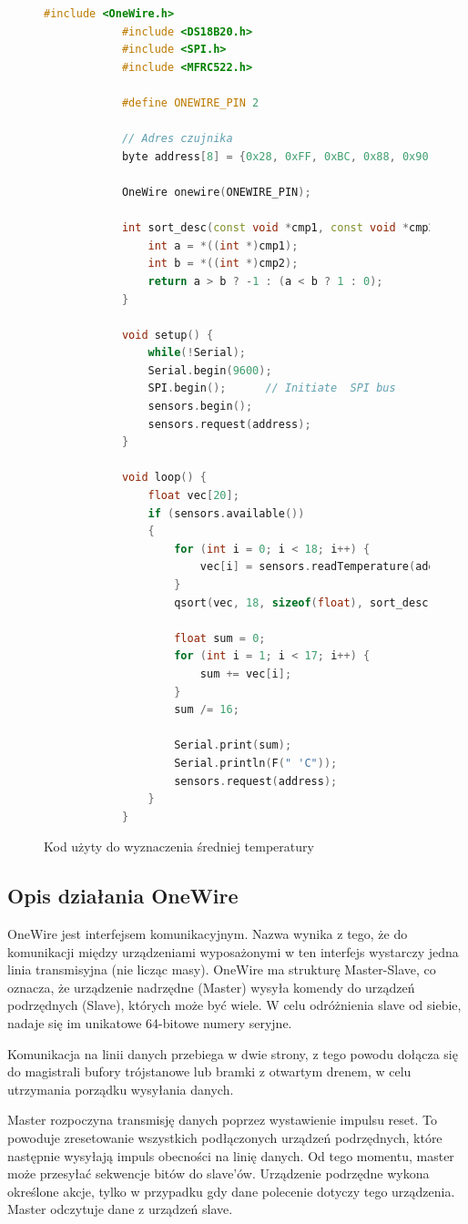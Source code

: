 \documentclass[polish,a4paper]{article}
\begin{document}
	\begin{figure}[h!]
		\begin{lstlisting}[language=C++, basicstyle=\tiny]
			#include <OneWire.h>
			#include <DS18B20.h>
			#include <SPI.h>
			#include <MFRC522.h>
			
			#define ONEWIRE_PIN 2
			
			// Adres czujnika
			byte address[8] = {0x28, 0xFF, 0xBC, 0x88, 0x90, 0x17, 0x5, 0x76};
			
			OneWire onewire(ONEWIRE_PIN);
			
			int sort_desc(const void *cmp1, const void *cmp2){
				int a = *((int *)cmp1);
				int b = *((int *)cmp2);
				return a > b ? -1 : (a < b ? 1 : 0);
			}
			
			void setup() {
				while(!Serial);
				Serial.begin(9600);
				SPI.begin();      // Initiate  SPI bus
				sensors.begin();
				sensors.request(address);
			}
			
			void loop() {
				float vec[20];
				if (sensors.available())
				{
					for (int i = 0; i < 18; i++) {
						vec[i] = sensors.readTemperature(address);
					}
					qsort(vec, 18, sizeof(float), sort_desc);
					
					float sum = 0;
					for (int i = 1; i < 17; i++) {
						sum += vec[i];
					}
					sum /= 16;
					
					Serial.print(sum);
					Serial.println(F(" 'C"));
					sensors.request(address);
				}
			}
		\end{lstlisting}
		\caption*{Kod użyty do wyznaczenia średniej temperatury}
	\end{figure}
	\subsection{Opis działania OneWire}
	OneWire jest interfejsem komunikacyjnym. Nazwa wynika z tego, że do komunikacji między urządzeniami wyposażonymi w ten interfejs wystarczy jedna linia transmisyjna (nie licząc masy). OneWire ma strukturę Master-Slave, co oznacza, że urządzenie nadrzędne (Master) wysyła komendy do urządzeń podrzędnych (Slave), których może być wiele. W celu odróżnienia slave od siebie, nadaje się im unikatowe 64-bitowe numery seryjne. 
	
	Komunikacja na linii danych przebiega w dwie strony, z tego powodu dołącza się do magistrali bufory trójstanowe lub bramki z otwartym drenem, w celu utrzymania porządku wysyłania danych. 
	
	Master rozpoczyna transmisję danych poprzez wystawienie impulsu reset. To powoduje zresetowanie wszystkich podłączonych urządzeń podrzędnych, które następnie wysyłają impuls obecności na linię danych. Od tego momentu, master może przesyłać sekwencje bitów do slave'ów. Urządzenie podrzędne wykona określone akcje, tylko w przypadku gdy dane polecenie dotyczy tego urządzenia. Master odczytuje dane z urządzeń slave.
	
\end{document}
